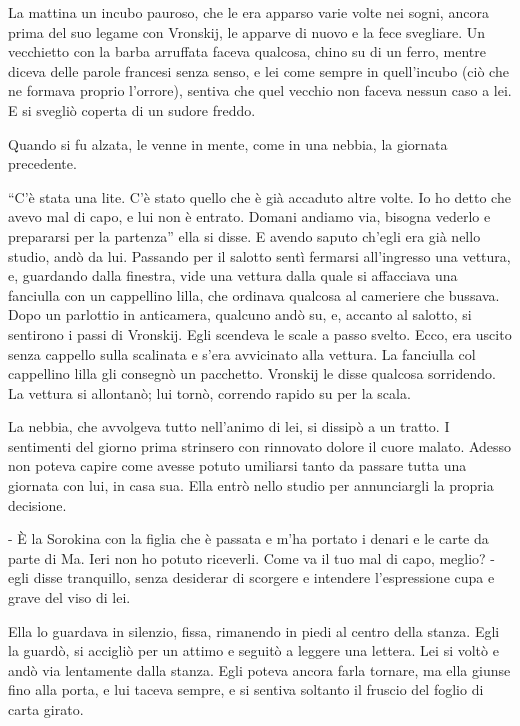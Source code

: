 La mattina un incubo pauroso, che le era apparso varie volte nei sogni, ancora prima del suo legame con Vronskij, le apparve di nuovo e la fece svegliare. Un vecchietto con la barba arruffata faceva qualcosa, chino su di un ferro, mentre diceva delle parole francesi senza senso, e lei come sempre in quell'incubo (ciò che ne formava proprio l'orrore), sentiva che quel vecchio non faceva nessun caso a lei. E si svegliò coperta di un sudore freddo. 

Quando si fu alzata, le venne in mente, come in una nebbia, la giornata precedente. 

``C'è stata una lite. C'è stato quello che è già accaduto altre volte. Io ho detto che avevo mal di capo, e lui non è entrato. Domani andiamo via, bisogna vederlo e prepararsi per la partenza'' ella si disse. E avendo saputo ch'egli era già nello studio, andò da lui. Passando per il salotto sentì fermarsi all'ingresso una vettura, e, guardando dalla finestra, vide una vettura dalla quale si affacciava una fanciulla con un cappellino lilla, che ordinava qualcosa al cameriere che bussava. Dopo un parlottio in anticamera, qualcuno andò su, e, accanto al salotto, si sentirono i passi di Vronskij. Egli scendeva le scale a passo svelto. Ecco, era uscito senza cappello sulla scalinata e s'era avvicinato alla vettura. La fanciulla col cappellino lilla gli consegnò un pacchetto. Vronskij le disse qualcosa sorridendo. La vettura si allontanò; lui tornò, correndo rapido su per la scala. 

La nebbia, che avvolgeva tutto nell'animo di lei, si dissipò a un tratto. I sentimenti del giorno prima strinsero con rinnovato dolore il cuore malato. Adesso non poteva capire come avesse potuto umiliarsi tanto da passare tutta una giornata con lui, in casa sua. Ella entrò nello studio per annunciargli la propria decisione. 

- È la Sorokina con la figlia che è passata e m'ha portato i denari e le carte da parte di Ma. Ieri non ho potuto riceverli. Come va il tuo mal di capo, meglio? - egli disse tranquillo, senza desiderar di scorgere e intendere l'espressione cupa e grave del viso di lei. 

Ella lo guardava in silenzio, fissa, rimanendo in piedi al centro della stanza. Egli la guardò, si accigliò per un attimo e seguitò a leggere una lettera. Lei si voltò e andò via lentamente dalla stanza. Egli poteva ancora farla tornare, ma ella giunse fino alla porta, e lui taceva sempre, e si sentiva soltanto il fruscio del foglio di carta girato. 

